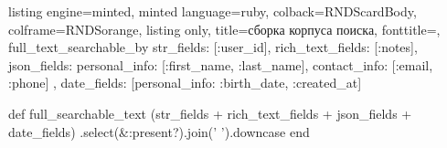 \begin{frame}[fragile, t]
    \begin{tcblisting}{
      listing engine=minted,
      minted language=ruby,
      colback=RNDScardBody,
      colframe=RNDSorange,
      listing only,
      title=сборка корпуса поиска,
      fonttitle=\normalsize,
    }
full_text_searchable_by 
  str_fields: [:user_id], 
  rich_text_fields: [:notes],
  json_fields: { 
    personal_info: [:first_name, :last_name], 
    contact_info: [:email, :phone] 
  },
  date_fields: [{personal_info: :birth_date}, :created_at]

def full_searchable_text
  (str_fields + rich_text_fields + json_fields + date_fields)
  .select(&:present?).join(' ').downcase
end
  \end{tcblisting}
\end{frame}
